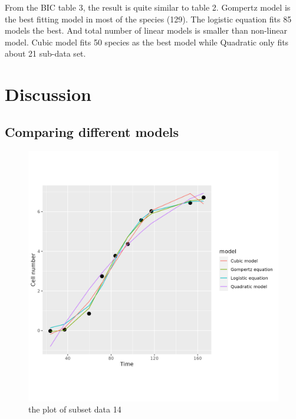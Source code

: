 \documentclass{article}
\begin{document}
From the BIC table 3, the result is quite similar to  table 2. Gompertz model is the best fitting model in most of the species (129). The logistic equation fits 85 models the best. And total number of linear models is smaller than non-linear model. Cubic model fits 50 species as the best model while Quadratic only fits about 21 sub-data set.


\section{Discussion}
\subsection{Comparing different models}
\begin{figure}
    \centering
    \includegraphics[width=0.5\linewidth]{../results/subset_ 14 _plot.png}
    \caption{the plot of subset data 14}
    \label{fig:enter-label}
\end{figure}
\end{document}
